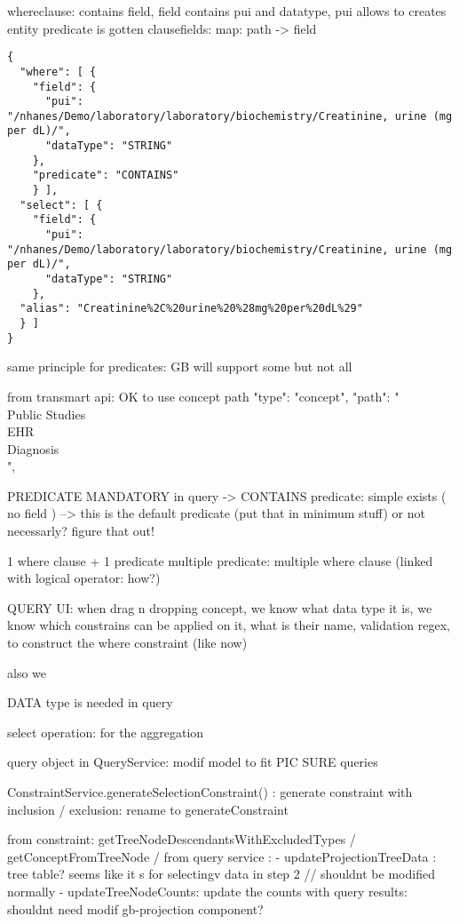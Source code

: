 whereclause:
contains field, field contains pui and datatype, pui allows to creates entity
predicate is gotten
clausefields: map: path -> field

\begin{verbatim}
{
  "where": [ {
    "field": {
      "pui": "/nhanes/Demo/laboratory/laboratory/biochemistry/Creatinine, urine (mg per dL)/", 
      "dataType": "STRING"
    },
    "predicate": "CONTAINS"
    } ],
  "select": [ {
    "field": {
      "pui": "/nhanes/Demo/laboratory/laboratory/biochemistry/Creatinine, urine (mg per dL)/",
      "dataType": "STRING"
    },
  "alias": "Creatinine%2C%20urine%20%28mg%20per%20dL%29"
  } ]
}
\end{verbatim}

same principle for predicates: GB will support some but not all 

from transmart api: OK to use concept path
 "type": "concept",
                "path": "\\Public Studies\\EHR\\Diagnosis\\",

PREDICATE MANDATORY in query
-> CONTAINS predicate: simple exists ( no field ) --> this is the default predicate (put that in minimum stuff) or not necessarly? figure that out!



1 where clause + 1 predicate
multiple predicate: multiple where clause (linked with logical operator: how?)

QUERY UI:
when drag n dropping concept, we know what data type it is, we know which constrains can be applied on it, what is their name, validation regex, to construct the where constraint (like now)

also we 

DATA type is needed in query

select operation: for the aggregation

query object in QueryService: modif model to fit PIC SURE queries

ConstraintService.generateSelectionConstraint() : generate constraint with inclusion / exclusion: rename to generateConstraint


from constraint: getTreeNodeDescendantsWithExcludedTypes / getConceptFromTreeNode / 
from query service : 
- updateProjectionTreeData : tree table? seems like it s for selectingv data in step 2 // shouldnt be modified normally
- updateTreeNodeCounts: update the counts with query results: shouldnt need modif
gb-projection component?

